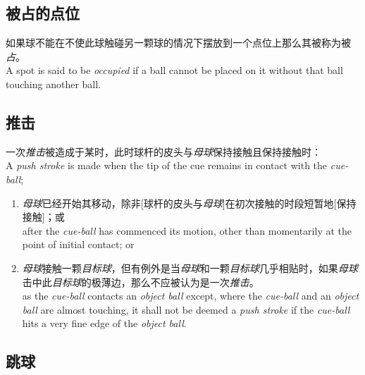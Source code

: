 \subsection{被占的点位}

\noindent 如果球不能在不使此球触碰另一颗球的情况下摆放到一个点位上那么其被称为被\emph{占}。\\
A spot is said to be \emph{occupied} if a ball cannot be placed on it without that ball touching another ball.

\subsection{推击}

\noindent 一次\emph{推击}被造成于某时，此时球杆的皮头与\emph{母球}保持接触且保持接触时：\\
A \emph{push stroke} is made when the tip of the cue remains in contact with the \emph{cue-ball};
\begin{enumerate}[label=(\alph*)]
    \item \emph{母球}已经开始其移动，除非[球杆的皮头与\emph{母球}]在初次接触的时段短暂地[保持接触]；或\\
    after the \emph{cue-ball} has commenced its motion, other than momentarily at the point of initial contact; or
    \item \emph{母球}接触一颗\emph{目标球}，但有例外是当\emph{母球}和一颗\emph{目标球}几乎相贴时，如果\emph{母球}击中此\emph{目标球}的极薄边，那么不应被认为是一次\emph{推击}。\\
    as the \emph{cue-ball} contacts an \emph{object ball} except, where the \emph{cue-ball} and an \emph{object ball} are almost touching, it shall not be deemed a \emph{push stroke} if the \emph{cue-ball} hits a very fine edge of the \emph{object ball}.
\end{enumerate}

\subsection{跳球}

